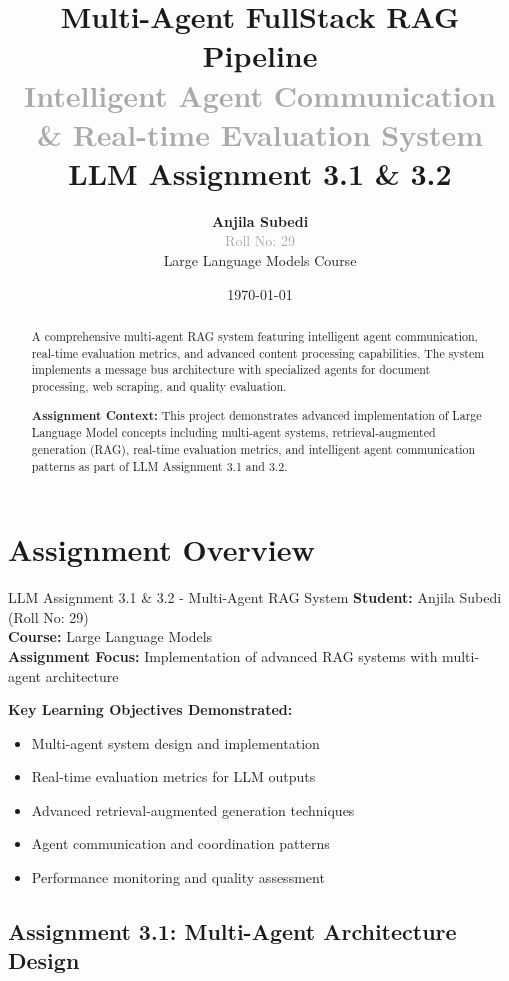 \documentclass[12pt,a4paper]{article}
\title{
    \vspace{-1cm}
    \Huge\textbf{\textcolor{primaryblue}{Multi-Agent FullStack RAG Pipeline}}\\
    \vspace{0.3cm}
    \Large\textcolor{darkgray}{Intelligent Agent Communication \& Real-time Evaluation System}\\
    \vspace{0.5cm}
    \large\textcolor{accentorange}{\textbf{LLM Assignment 3.1 \& 3.2}}
}
\author{
    \textbf{Anjila Subedi}\\
    \textcolor{darkgray}{Roll No: 29}\\
    \vspace{0.2cm}
    \textcolor{primaryblue}{Large Language Models Course}
}
\date{\today}
\begin{document}
\maketitle

\begin{abstract}
A comprehensive multi-agent RAG system featuring intelligent agent communication, real-time evaluation metrics, and advanced content processing capabilities. The system implements a message bus architecture with specialized agents for document processing, web scraping, and quality evaluation.

\textbf{Assignment Context:} This project demonstrates advanced implementation of Large Language Model concepts including multi-agent systems, retrieval-augmented generation (RAG), real-time evaluation metrics, and intelligent agent communication patterns as part of LLM Assignment 3.1 and 3.2.
\end{abstract}

\section{Assignment Overview}

\begin{infobox}{LLM Assignment 3.1 \& 3.2 - Multi-Agent RAG System}
\textbf{Student:} Anjila Subedi (Roll No: 29)\\
\textbf{Course:} Large Language Models\\
\textbf{Assignment Focus:} Implementation of advanced RAG systems with multi-agent architecture

\textbf{Key Learning Objectives Demonstrated:}
\begin{itemize}
    \item Multi-agent system design and implementation
    \item Real-time evaluation metrics for LLM outputs
    \item Advanced retrieval-augmented generation techniques
    \item Agent communication and coordination patterns
    \item Performance monitoring and quality assessment
\end{itemize}
\end{infobox}

\subsection{Assignment 3.1: Multi-Agent Architecture Design}
\end{document}

